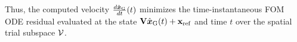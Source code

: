\documentclass[3p,computermodern,10pt]{elsarticle}
\begin{document}
Thus, the computed velocity $\frac{d\hat{ \boldsymbol x}_{\text{G}}}{dt}(t)$ minimizes the
time-instantaneous FOM ODE residual evaluated at the state $\mathbf {V}
\hat{ \boldsymbol x}_{\text{G}}(t) + \mathbf{x}_\text{ref}$ and time $t$ over the spatial trial
subspace $\mathcal{V }$.
\end{document}
